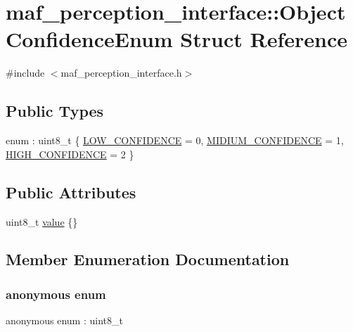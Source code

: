 \hypertarget{structmaf__perception__interface_1_1ObjectConfidenceEnum}{}\section{maf\+\_\+perception\+\_\+interface\+:\+:Object\+Confidence\+Enum Struct Reference}
\label{structmaf__perception__interface_1_1ObjectConfidenceEnum}


{\ttfamily \#include $<$maf\+\_\+perception\+\_\+interface.\+h$>$}

\subsection*{Public Types}
\begin{DoxyCompactItemize}
\item 
enum \+: uint8\+\_\+t \{ \hyperlink{structmaf__perception__interface_1_1ObjectConfidenceEnum_a98bdea521143cad6b3a3b7bdbadf4cceaae0f8e370ff52eb5e5ea41a2ec22f132}{L\+O\+W\+\_\+\+C\+O\+N\+F\+I\+D\+E\+N\+CE} = 0, 
\hyperlink{structmaf__perception__interface_1_1ObjectConfidenceEnum_a98bdea521143cad6b3a3b7bdbadf4ccea58d89a4c03c218eb3f97906ceff6ab85}{M\+I\+D\+I\+U\+M\+\_\+\+C\+O\+N\+F\+I\+D\+E\+N\+CE} = 1, 
\hyperlink{structmaf__perception__interface_1_1ObjectConfidenceEnum_a98bdea521143cad6b3a3b7bdbadf4ccea6b093962718f1f9ef1d4378b5bbb3d61}{H\+I\+G\+H\+\_\+\+C\+O\+N\+F\+I\+D\+E\+N\+CE} = 2
 \}
\end{DoxyCompactItemize}
\subsection*{Public Attributes}
\begin{DoxyCompactItemize}
\item 
uint8\+\_\+t \hyperlink{structmaf__perception__interface_1_1ObjectConfidenceEnum_abfe470eb22e59bc7d1aa69ae42af78b0}{value} \{\}
\end{DoxyCompactItemize}


\subsection{Member Enumeration Documentation}
\mbox{\label{structmaf__perception__interface_1_1ObjectConfidenceEnum_a98bdea521143cad6b3a3b7bdbadf4cce}} 
\subsubsection{\texorpdfstring{anonymous enum}{anonymous enum}}
{\footnotesize\ttfamily anonymous enum \+: uint8\+\_\+t}

